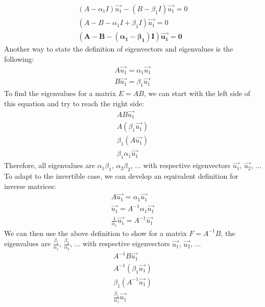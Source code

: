 \documentclass[12pt]{article}
\begin{document}
\begin{enumerate}[label=\alph*.]
	\begin{gather*}
	    (A - \alpha_1 I)\vec{u_1} - (B - \beta_1 I)\vec{u_1}  = 0 \\
	    (A - B - \alpha_1 I + \beta_1 I)\vec{u_1} = 0 \\
	    \mathbf{(A - B - (\alpha_1 - \beta_1) I)\vec{u_1} = 0}
	\end{gather*}
    Another way to state the definition of eigenvectors and eigenvalues is the following:
	\begin{gather*}
	    A\vec{u_1} = \alpha_1 \vec{u_1} \\
	    B\vec{u_1} = \beta_1 \vec{u_1} 
	\end{gather*}
    To find the eigenvalues for a matrix \( E = AB \), we can start with the left side of this equation and try to reach the right side:
	\begin{gather*}
	    AB\vec{u_1} \\
	    A(\beta_1 \vec{u_1}) \\
	    \beta_1 (A \vec{u_1}) \\
	    \beta_1 \alpha_1 \vec{u_1}
	\end{gather*}
    Therefore, all eigenvalues are \(\alpha_1 \beta_1\), \(\alpha_2 \beta_2\), ... with respective eigenvectors \(\vec{u_1}\), \(\vec{u_2}\), ... \\
    To adapt to the invertible case, we can develop an equivalent definition for inverse matrices:
	\begin{gather*}
	    A\vec{u_1} = \alpha_1 \vec{u_1} \\
	    \vec{u_1} = A^{-1} \alpha_1 \vec{u_1} \\
	    \frac{1}{\alpha_1} \vec{u_1} = A^{-1} \vec{u_1}
	\end{gather*}
    We can then use the above definition to show for a matrix \( F = A^{-1}B \), the eigenvalues are \(\frac{\beta_1}{\alpha_1}\), \(\frac{\beta_2}{\alpha_2}\), ... with respective eigenvectors \(\vec{u_1}\), \(\vec{u_2}\), ... \\
	\begin{gather*}
	    A^{-1} B\vec{u_1} \\
	    A^{-1} (\beta_1 \vec{u_1}) \\
	    \beta_1 (A^{-1} \vec{u_1}) \\
	    \frac{\beta_1}{\alpha_1} \vec{u_1}
	\end{gather*}
\end{enumerate}
\end{document}
